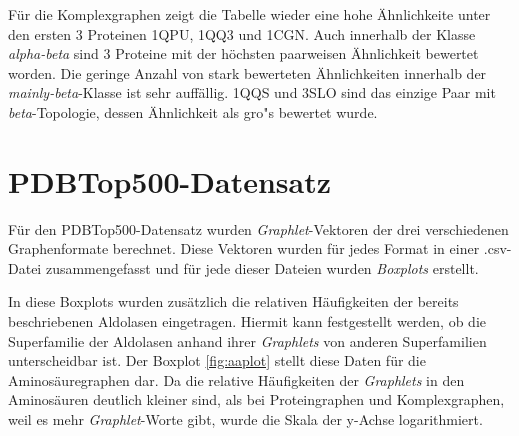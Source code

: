 \documentclass{report}
\begin{document}
F\"ur die Komplexgraphen zeigt die Tabelle wieder eine hohe \"Ahnlichkeite unter den ersten 3 Proteinen 1QPU, 1QQ3 und 1CGN. Auch innerhalb der Klasse \textit{alpha-beta} sind 3 Proteine mit der h\"ochsten paarweisen \"Ahnlichkeit bewertet worden. Die geringe Anzahl von stark bewerteten \"Ahnlichkeiten innerhalb der \textit{mainly-beta}-Klasse ist sehr auff\"allig. 1QQS und 3SLO sind das einzige Paar mit \textit{beta}-Topologie, dessen \"Ahnlichkeit als gro"s bewertet wurde.


\section{PDBTop500-Datensatz}

F\"ur den PDBTop500-Datensatz wurden \textit{Graphlet}-Vektoren der drei verschiedenen Graphenformate berechnet. Diese Vektoren wurden f\"ur jedes Format in einer .csv-Datei zusammengefasst und f\"ur jede dieser Dateien wurden \textit{Boxplots} erstellt.

In diese Boxplots wurden zus\"atzlich die relativen H\"aufigkeiten der bereits beschriebenen Aldolasen eingetragen. Hiermit kann festgestellt werden, ob die Superfamilie der Aldolasen anhand ihrer \textit{Graphlets} von anderen Superfamilien unterscheidbar ist.
Der Boxplot \ref{fig:aaplot} stellt diese Daten f\"ur die Aminos\"auregraphen dar. Da die relative H\"aufigkeiten der \textit{Graphlets} in den Aminos\"auren deutlich kleiner sind, als bei Proteingraphen und Komplexgraphen, weil es mehr \textit{Graphlet}-Worte gibt, wurde die Skala der y-Achse logarithmiert.
\end{document}
